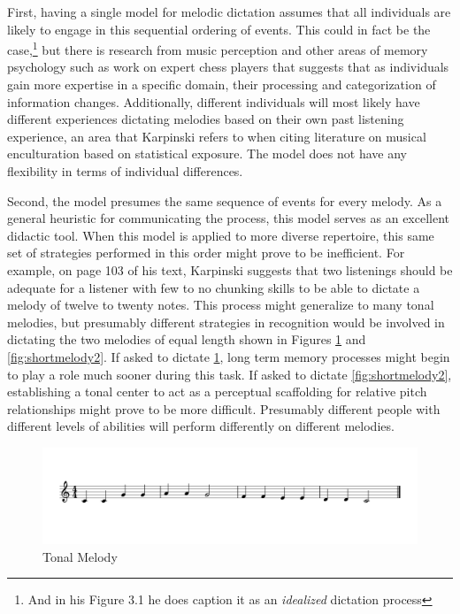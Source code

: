 \documentclass[12pt,]{book}
\let\rmarkdownfootnote\footnote%
\def\footnote{\protect\rmarkdownfootnote}
\begin{document}
First, having a single model for melodic dictation assumes that all individuals are likely to engage in this sequential ordering of events.
This could in fact be the case,\footnote{And in his Figure 3.1 he does caption it as an \emph{idealized} dictation process} but there is research from music perception \citep{goldmanImprovisationExperiencePredicts2018} and other areas of memory psychology such as work on expert chess players \citep{laneChessKnowledgePredicts2018} that suggests that as individuals gain more expertise in a specific domain, their processing and categorization of information changes.
Additionally, different individuals will most likely have different experiences dictating melodies based on their own past listening experience, an area that Karpinski refers to when citing literature on musical enculturation based on statistical exposure.
The model does not have any flexibility in terms of individual differences.

Second, the model presumes the same sequence of events for every melody.
As a general heuristic for communicating the process, this model serves as an excellent didactic tool.
When this model is applied to more diverse repertoire, this same set of strategies performed in this order might prove to be inefficient.
For example, on page 103 of his text, Karpinski suggests that two listenings should be adequate for a listener with few to no chunking skills to be able to dictate a melody of twelve to twenty notes.
This process might generalize to many tonal melodies, but presumably different strategies in recognition would be involved in dictating the two melodies of equal length shown in Figures \ref{fig:shortmelody1} and \ref{fig:shortmelody2}.
If asked to dictate \ref{fig:shortmelody1}, long term memory processes might begin to play a role much sooner during this task.
If asked to dictate \ref{fig:shortmelody2}, establishing a tonal center to act as a perceptual scaffolding for relative pitch relationships might prove to be more difficult.
Presumably different people with different levels of abilities will perform differently on different melodies.

\begin{figure}

{\centering \includegraphics[width=1\linewidth]{img/musicalexamples/MMD_Figure2-1} 

}

\caption{Tonal Melody}\label{fig:shortmelody1}
\end{figure}
\end{document}
